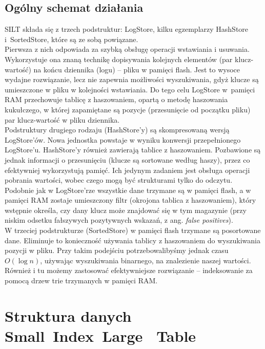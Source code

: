 \documentclass[declaration,shortabstract,masc]{iithesis}
\begin{document}
		\section{Ogólny schemat działania}
			SILT składa się z trzech podstruktur: LogStore, kilku egzemplarzy HashStore i~SortedStore, które są ze sobą powiązane.\\
			\indent Pierwsza z nich odpowiada za szybką obsługę operacji wstawiania i usuwania. Wykorzystuje ona znaną technikę dopisywania kolejnych elementów (par klucz-wartość) na końcu dziennika (logu) -- pliku w pamięci flash. Jest to wysoce wydajne rozwiązanie, lecz nie zapewnia możliwości wyszukiwania, gdyż klucze są umieszczone w pliku w kolejności wstawiania. Do tego celu LogStore w~pamięci RAM przechowuje tablicę z haszowaniem, opartą o metodę haszowania kukułczego, w której zapamiętane są pozycje (przesunięcie od początku pliku) par klucz-wartość w pliku dziennika.\\
			\indent Podstruktury drugiego rodzaju (HashStore'y) są skompresowaną wersją LogStore'ów. Nowa jednostka powstaje w wyniku konwersji przepełnionego LogStore'u. HashStore'y również zawierają tablice z haszowaniem. Pozbawione są jednak informacji o przesunięciu (klucze są sortowane według haszy), przez co efektywniej wykorzystują pamięć. Ich jedynym zadaniem jest obsługa operacji pobrania wartości, wobec czego mogą być strukturami tylko do odczytu. Podobnie jak w LogStore'rze wszystkie dane trzymane są w pamięci flash, a w pamięci RAM zostaje umieszczony filtr (okrojona tablica z haszowaniem), który wstępnie określa, czy dany klucz może znajdować się w tym magazynie (przy niskim odsetku fałszywych pozytywnych wskazań, z ang. \textit{false positives}).\\
			\indent W trzeciej podstrukturze (SortedStore) w pamięci flash trzymane są posortowane dane. Eliminuje to konieczność używania tablicy z haszowaniem do wyszukiwania pozycji w pliku. Przy takim podejściu potrzebowalibyśmy jednak czasu $O\left(\log n\right)$, używając wyszukiwania binarnego, na znalezienie naszej wartości. Również i tu możemy zastosować efektywniejsze rozwiązanie -- indeksowanie za pomocą drzew trie trzymanych w pamięci RAM.
	\chapter{Struktura danych Small~Index~Large~	Table}
\end{document}
